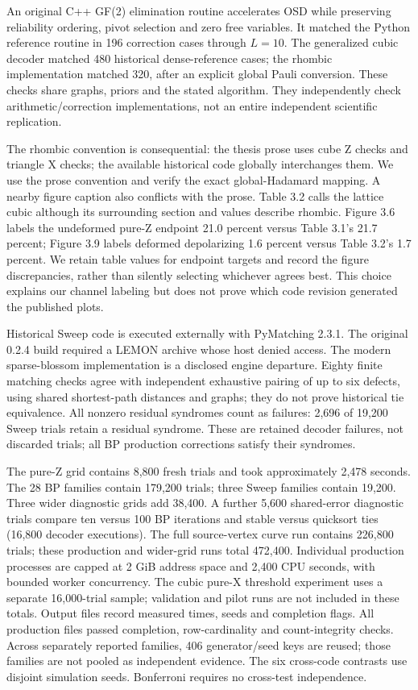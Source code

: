 An original C++ GF(2) elimination routine accelerates OSD while preserving reliability ordering, pivot selection and zero free variables. It matched the Python reference routine in 196 correction cases through $L=10$. The generalized cubic decoder matched 480 historical dense-reference cases; the rhombic implementation matched 320, after an explicit global Pauli conversion. These checks share graphs, priors and the stated algorithm. They independently check arithmetic/correction implementations, not an entire independent scientific replication.

The rhombic convention is consequential: the thesis prose uses cube Z checks and triangle X checks; the available historical code globally interchanges them. We use the prose convention and verify the exact global-Hadamard mapping. A nearby figure caption also conflicts with the prose. Table 3.2 calls the lattice cubic although its surrounding section and values describe rhombic. Figure 3.6 labels the undeformed pure-Z endpoint 21.0 percent versus Table 3.1's 21.7 percent; Figure 3.9 labels deformed depolarizing 1.6 percent versus Table 3.2's 1.7 percent. We retain table values for endpoint targets and record the figure discrepancies, rather than silently selecting whichever agrees best. This choice explains our channel labeling but does not prove which code revision generated the published plots.

Historical Sweep code is executed externally with PyMatching 2.3.1. The original 0.2.4 build required a LEMON archive whose host denied access. The modern sparse-blossom implementation \citep{higgott2025} is a disclosed engine departure. Eighty finite matching checks agree with independent exhaustive pairing of up to six defects, using shared shortest-path distances and graphs; they do not prove historical tie equivalence. All nonzero residual syndromes count as failures: 2,696 of 19,200 Sweep trials retain a residual syndrome. These are retained decoder failures, not discarded trials; all BP production corrections satisfy their syndromes.

The pure-Z grid contains 8,800 fresh trials and took approximately 2,478 seconds. The 28 BP families contain 179,200 trials; three Sweep families contain 19,200. Three wider diagnostic grids add 38,400. A further 5,600 shared-error diagnostic trials compare ten versus 100 BP iterations and stable versus quicksort ties (16,800 decoder executions). The full source-vertex curve run contains 226,800 trials; these production and wider-grid runs total 472,400. Individual production processes are capped at 2 GiB address space and 2,400 CPU seconds, with bounded worker concurrency. The cubic pure-X threshold experiment uses a separate 16,000-trial sample; validation and pilot runs are not included in these totals. Output files record measured times, seeds and completion flags. All production files passed completion, row-cardinality and count-integrity checks. Across separately reported families, 406 generator/seed keys are reused; those families are not pooled as independent evidence. The six cross-code contrasts use disjoint simulation seeds. Bonferroni requires no cross-test independence.

